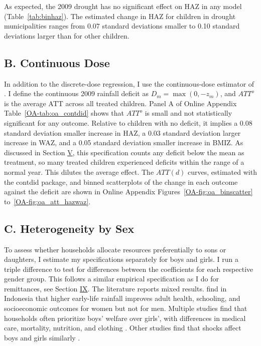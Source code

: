 \documentclass[12pt]{article}
\begin{document}
As expected, the 2009 drought has no significant effect on HAZ in any model (Table~\ref{tab:binhaz}). The estimated change in HAZ for children in drought municipalities ranges from 0.07 standard deviations smaller to 0.10 standard deviations larger than for other children.

\subsection*{B. Continuous Dose}

In addition to the discrete-dose regression, I use the continuous-dose estimator of \textcite{callawayDifferenceinDifferencesContinuousTreatment2024}. I define the continuous 2009 rainfall deficit as $D_m = \max(0, -z_m)$, and $ATT^o$ is the average ATT across all treated children. Panel A of Online Appendix Table~\ref{OA-tab:oa_contdid} shows that $ATT^o$ is small and not statistically significant for any outcome. Relative to children with no deficit, it implies a 0.08 standard deviation smaller increase in HAZ, a 0.03 standard deviation larger increase in WAZ, and a 0.05 standard deviation smaller increase in BMIZ. As discussed in Section \hyperref[sec:V]{V}, this specification counts any deficit below the mean as treatment, so many treated children experienced deficits within the range of a normal year. This dilutes the average effect. The $ATT(d)$ curves, estimated with the contdid package, and binned scatterplots of the change in each outcome against the deficit are shown in Online Appendix Figures~\ref{OA-fig:oa_binscatter} to~\ref{OA-fig:oa_att_hazwaz}.

\subsection*{C. Heterogeneity by Sex}

To assess whether households allocate resources preferentially to sons or daughters, I estimate my specifications separately for boys and girls. I run a triple difference to test for differences between the coefficients for each respective gender group. This follows a similar empirical specification as I do for remittances, see Section \hyperref[sec:IX]{IX}. The literature reports mixed results. \textcite{macciniWeatherHealthSchooling2009} find in Indonesia that higher early-life rainfall improves adult health, schooling, and socioeconomic outcomes for women but not for men. Multiple studies find that households often prioritize boys' welfare over girls', with differences in medical care, mortality, nutrition, and clothing \parencite{dasguptaSelectiveDiscriminationFemale1987,behrmanIntrahouseholdAllocationNutrients1988,behrmanIntrahouseholdDemandNutrients1990,roseConsumptionSmoothingExcess1999,aldermanFamilyResourcesGender1997}. Other studies find that shocks affect boys and girls similarly \parencite{levineGenderBiasIndonesian2003}.
\end{document}
